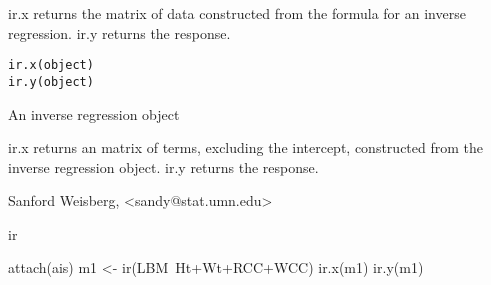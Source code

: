 \documentclass[letterpaper]{book}
\begin{document}
\begin{Description}\relax
ir.x returns the matrix of data constructed from the formula for an
inverse regression.  ir.y returns the response.\end{Description}
\begin{Usage}
\begin{verbatim}
ir.x(object)
ir.y(object)
\end{verbatim}
\end{Usage}
\begin{Arguments}
\begin{ldescription}
\item[\code{object}] An inverse regression object
\end{ldescription}
\end{Arguments}
\begin{Value}
ir.x returns an  matrix of terms, excluding the 
intercept, constructed from the inverse regression object.  ir.y returns the
response.\end{Value}
\begin{Author}\relax
Sanford Weisberg, <sandy@stat.umn.edu>\end{Author}
\begin{SeeAlso}\relax
ir\end{SeeAlso}
\begin{Examples}
\begin{ExampleCode}
attach(ais)
m1 <- ir(LBM~Ht+Wt+RCC+WCC)
ir.x(m1)
ir.y(m1)
\end{ExampleCode}
\end{Examples}
\end{document}
